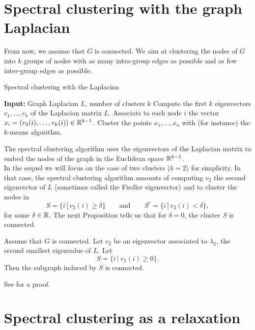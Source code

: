 \documentclass[11pt,nocut]{article}
\begin{document}
\section{Spectral clustering with the graph Laplacian}

From now, we assume that $G$ is connected. We aim at clustering the nodes of $G$ into $k$ groups of nodes with as many intra-group edges as possible and as few inter-group edges as possible.


\begin{algorithm}
\caption{Spectral clustering with the Laplacian}
\begin{algorithmic}[1]
	\Statex \textbf{Input:} Graph Laplacian $L$, number of clusters $k$
	\State Compute the first $k$ eigenvectors $v_1, \dots, v_k$ of the Laplacian matrix $L$.
	\State Associate to each node $i$ the vector $x_i = (v_2(i), \dots, v_k(i)) \in \mathbb{R}^{k-1}$.
	\State Cluster the points $x_1, \dots, x_n$ with (for instance) the $k$-means algorithm.
\end{algorithmic}
\end{algorithm}

The spectral clustering algorithm uses the eigenvectors of the Laplacian matrix to embed the nodes of the graph in the Euclidean space $\mathbb{R}^{k-1}$.
\\

In the sequel we will focus on the case of two clusters ($k=2$) for simplicity.
In that case, the spectral clustering algorithm amounts of computing $v_2$ the second eigenvector of $L$ (sometimes called the Fiedler eigenvector) and to cluster the nodes in
$$
S = \{ i \, | \, v_2(i) \geq \delta \} \qquad \text{and} \qquad
S^c = \{ i \, | \, v_2(i) < \delta \},
$$
for some $\delta \in \mathbb{R}$.
The next Proposition tells us that for $\delta = 0$, the cluster $S$ is connected.
\begin{proposition}
	Assume that $G$ is connected. Let $v_2$ be an eigenvector associated to $\lambda_2$, the second smallest eigenvalue of $L$. Let
	$$
	S = \{ i \, | \ v_2(i) \geq 0 \}.
	$$
	Then the subgraph induced by $S$ is connected.
\end{proposition}
 
See \cite{spielman2012spectral} for a proof.

\section{Spectral clustering as a relaxation}
\end{document}
